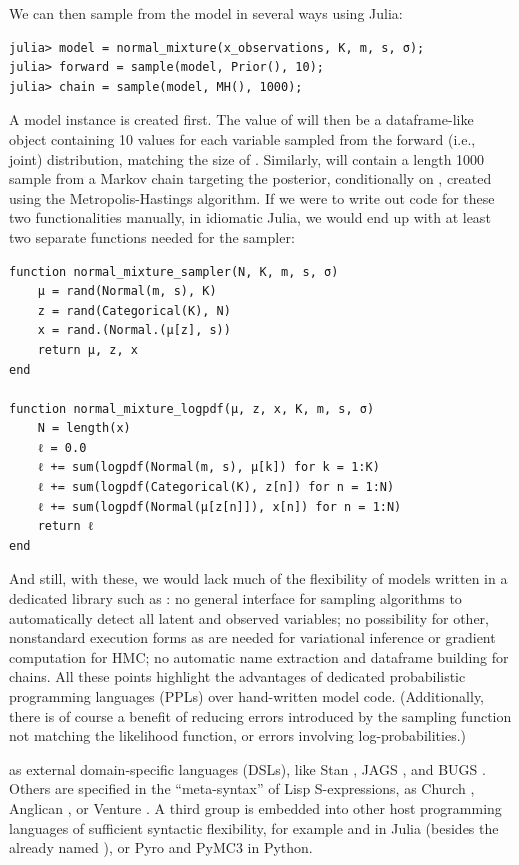 We can then sample from the model in several ways using Julia:
\begin{lstlisting}
julia> model = normal_mixture(x_observations, K, m, s, σ);
julia> forward = sample(model, Prior(), 10);
julia> chain = sample(model, MH(), 1000);
\end{lstlisting}
A model instance  is created first.  The value of  will then be a
dataframe-like object containing 10 values for each variable sampled from the forward (i.e., joint)
distribution, matching the size of .  Similarly,  will contain a
length 1000 sample from a Markov chain targeting the posterior, conditionally on
, created using the Metropolis-Hastings algorithm.  If we were to write out
code for these two functionalities manually, in idiomatic Julia, we would end up with at least two
separate functions needed for the sampler:
\begin{lstlisting}
function normal_mixture_sampler(N, K, m, s, σ)
    μ = rand(Normal(m, s), K)
    z = rand(Categorical(K), N)
    x = rand.(Normal.(μ[z], s))
    return μ, z, x
end

function normal_mixture_logpdf(μ, z, x, K, m, s, σ)
    N = length(x)
    ℓ = 0.0
    ℓ += sum(logpdf(Normal(m, s), μ[k]) for k = 1:K)
    ℓ += sum(logpdf(Categorical(K), z[n]) for n = 1:N)
    ℓ += sum(logpdf(Normal(μ[z[n]]), x[n]) for n = 1:N)
    return ℓ
end
\end{lstlisting}
And still, with these, we would lack much of the flexibility of models written in a dedicated
library such as \turingjl{}: no general interface for sampling algorithms to automatically detect
all latent and observed variables; no possibility for other, nonstandard execution forms as are
needed for variational inference or gradient computation for HMC; no automatic name extraction and
dataframe building for chains.  All these points highlight the advantages of dedicated probabilistic
programming languages (PPLs) over hand-written model code.  (Additionally, there is of course a
benefit of reducing errors introduced by the sampling function not matching the likelihood function,
or errors involving log-probabilities.)

 as external domain-specific languages (DSLs), like Stan
\parencite{carpenter2017stan}, JAGS \parencite{plummer2003jags}, and BUGS
\parencite{lunn2000winbugs,lunn2009bugs}.  Others are specified in the \enquote{meta-syntax} of Lisp
S-expressions, as Church \parencite{goodman2012church}, Anglican \parencite{wood2015new}, or Venture
\parencite{mansinghka2014venture}.  A third group is embedded into other host programming languages
of sufficient syntactic flexibility, for example 
\parencite{cusumano-towner2019gen,cusumano-towner2020gen} and 
\parencite{scherrer2019soss} in Julia (besides the already named \turingjl{}), or Pyro
\parencite{bingham2018pyro} and PyMC3 \parencite{salvatier2016probabilistic} in Python.

